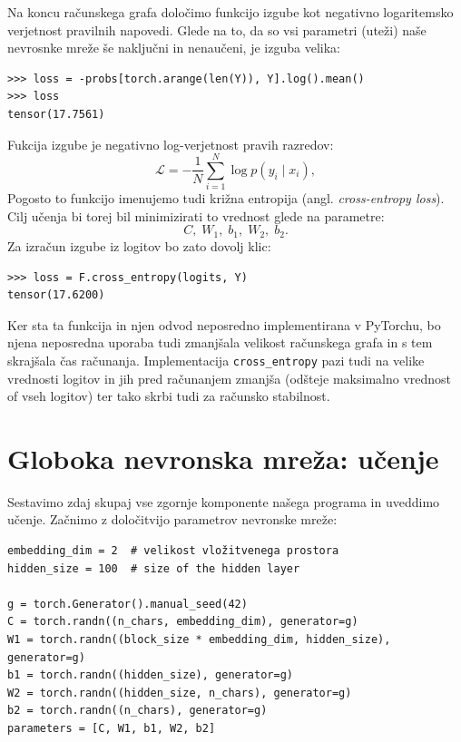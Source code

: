 Na koncu računskega grafa določimo funkcijo izgube kot negativno logaritemsko verjetnost pravilnih napovedi. Glede na to, da so vsi parametri (uteži) naše nevrosnke mreže še naključni in nenaučeni, je izguba velika:
%
\vspace*{3mm}
\begin{lstlisting}
>>> loss = -probs[torch.arange(len(Y)), Y].log().mean()
>>> loss
tensor(17.7561)
\end{lstlisting}

Fukcija izgube je negativno log-verjetnost pravih razredov:
%
%
\[
\mathcal{L}
=
-\frac{1}{N}
\sum_{i=1}^N
\log p(y_i \mid x_i),
\]
Pogosto to funkcijo imenujemo tudi križna entropija (angl. \emph{cross-entropy loss}). Cilj učenja bi torej bil minimizirati to vrednost glede na parametre:
\[
C,\; W_1,\; b_1,\; W_2,\; b_2.
\]
Za izračun izgube iz logitov bo zato dovolj klic:
\vspace*{3mm}
\begin{lstlisting}
>>> loss = F.cross_entropy(logits, Y)
tensor(17.6200)
\end{lstlisting}
Ker sta ta funkcija in njen odvod neposredno implementirana v PyTorchu, bo njena neposredna uporaba tudi zmanjšala velikost računskega grafa in s tem skrajšala čas računanja. Implementacija \texttt{cross\_entropy} pazi tudi na velike vrednosti logitov in jih pred računanjem zmanjša (odšteje maksimalno vrednost of vseh logitov) ter tako skrbi tudi za računsko stabilnost.

\section{Globoka nevronska mreža: učenje}

Sestavimo zdaj skupaj vse zgornje komponente našega programa in uveddimo učenje. Začnimo z določitvijo parametrov nevronske mreže:
%
\vspace*{3mm}
\begin{lstlisting}
embedding_dim = 2  # velikost vložitvenega prostora
hidden_size = 100  # size of the hidden layer

g = torch.Generator().manual_seed(42)
C = torch.randn((n_chars, embedding_dim), generator=g)
W1 = torch.randn((block_size * embedding_dim, hidden_size), generator=g)
b1 = torch.randn((hidden_size), generator=g)
W2 = torch.randn((hidden_size, n_chars), generator=g)
b2 = torch.randn((n_chars), generator=g)
parameters = [C, W1, b1, W2, b2]
\end{lstlisting}

